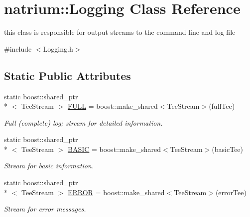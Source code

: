 \hypertarget{classnatrium_1_1Logging}{\section{natrium\-:\-:Logging Class Reference}
\label{classnatrium_1_1Logging}
}


this class is responsible for output streams to the command line and log file  




{\ttfamily \#include $<$Logging.\-h$>$}

\subsection*{Static Public Attributes}
\begin{DoxyCompactItemize}
\item 
\hypertarget{classnatrium_1_1Logging_a3f7c1686be8b25fcfec6f624467d6346}{static boost\-::shared\-\_\-ptr\\*
$<$ Tee\-Stream $>$ \hyperlink{classnatrium_1_1Logging_a3f7c1686be8b25fcfec6f624467d6346}{F\-U\-L\-L} = boost\-::make\-\_\-shared$<$Tee\-Stream$>$(full\-Tee)}\label{classnatrium_1_1Logging_a3f7c1686be8b25fcfec6f624467d6346}

\begin{DoxyCompactList}\small\item\em Full (complete) log; stream for detailed information. \end{DoxyCompactList}\item 
\hypertarget{classnatrium_1_1Logging_addbf66b690d29a9f8ca9edbc82672d36}{static boost\-::shared\-\_\-ptr\\*
$<$ Tee\-Stream $>$ \hyperlink{classnatrium_1_1Logging_addbf66b690d29a9f8ca9edbc82672d36}{B\-A\-S\-I\-C} = boost\-::make\-\_\-shared$<$Tee\-Stream$>$(basic\-Tee)}\label{classnatrium_1_1Logging_addbf66b690d29a9f8ca9edbc82672d36}

\begin{DoxyCompactList}\small\item\em Stream for basic information. \end{DoxyCompactList}\item 
\hypertarget{classnatrium_1_1Logging_a83b60e3e23cc20425605e3b57962460d}{static boost\-::shared\-\_\-ptr\\*
$<$ Tee\-Stream $>$ \hyperlink{classnatrium_1_1Logging_a83b60e3e23cc20425605e3b57962460d}{E\-R\-R\-O\-R} = boost\-::make\-\_\-shared$<$Tee\-Stream$>$(error\-Tee)}\label{classnatrium_1_1Logging_a83b60e3e23cc20425605e3b57962460d}

\begin{DoxyCompactList}\small\item\em Stream for error messages. \end{DoxyCompactList}\end{DoxyCompactItemize}



